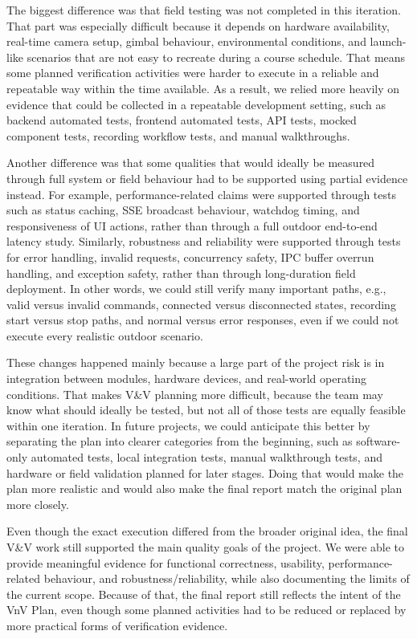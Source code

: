 \documentclass[12pt, titlepage]{article}
\begin{document}
\begin{enumerate}
        The biggest difference was that field testing was not completed in this
        iteration. That part was especially difficult because it depends on hardware
        availability, real-time camera setup, gimbal behaviour, environmental
        conditions, and launch-like scenarios that are not easy to recreate during a
        course schedule. That means some planned verification activities were harder to
        execute in a reliable and repeatable way within the time available. As a
        result, we relied more heavily on evidence that could be collected in a
        repeatable development setting, such as backend automated tests, frontend
        automated tests, API tests, mocked component tests, recording workflow tests,
        and manual walkthroughs.

        Another difference was that some qualities that would ideally be measured
        through full system or field behaviour had to be supported using partial
        evidence instead. For example, performance-related claims were supported
        through tests such as status caching, SSE broadcast behaviour, watchdog timing,
        and responsiveness of UI actions, rather than through a full outdoor end-to-end
        latency study. Similarly, robustness and reliability were supported through
        tests for error handling, invalid requests, concurrency safety, IPC buffer
        overrun handling, and exception safety, rather than through long-duration field
        deployment. In other words, we could still verify many important paths, e.g.,
        valid versus invalid commands, connected versus disconnected states, recording
        start versus stop paths, and normal versus error responses, even if we could
        not execute every realistic outdoor scenario.

        These changes happened mainly because a large part of the project risk is in
        integration between modules, hardware devices, and real-world operating
        conditions. That makes V\&V planning more difficult, because the team may know
        what should ideally be tested, but not all of those tests are equally feasible
        within one iteration. In future projects, we could anticipate this better by
        separating the plan into clearer categories from the beginning, such as
        software-only automated tests, local integration tests, manual walkthrough
        tests, and hardware or field validation planned for later stages. Doing that
        would make the plan more realistic and would also make the final report match
        the original plan more closely.

        Even though the exact execution differed from the broader original idea, the
        final V\&V work still supported the main quality goals of the project. We were
        able to provide meaningful evidence for functional correctness, usability,
        performance-related behaviour, and robustness/reliability, while also
        documenting the limits of the current scope. Because of that, the final report
        still reflects the intent of the VnV Plan, even though some planned activities
        had to be reduced or replaced by more practical forms of verification evidence.
\end{enumerate}
\end{document}
